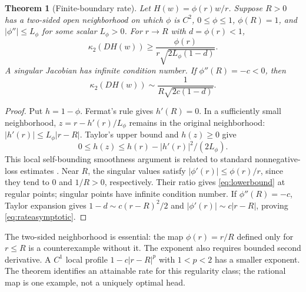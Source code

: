 \documentclass[10pt,a4paper]{article}
\newtheorem{theorem}{Theorem}
\begin{document}
\begin{theorem}[Finite-boundary rate]
\label{thm:rate}
Let $H(w)=\phi(r)w/r$. Suppose $R>0$ has a two-sided open neighborhood on which $\phi$ is $C^2$, $0\leq\phi\leq1$, $\phi(R)=1$, and $|\phi''|\leq L_\phi$ for some scalar $L_\phi>0$. For $r\to R$ with $d=\phi(r)<1$,
\begin{equation}
 \kappa_2(DH(w))\geq\frac{\phi(r)}{r\sqrt{2L_\phi(1-d)}}.
 \label{eq:lowerbound}
\end{equation}
A singular Jacobian has infinite condition number. If $\phi''(R)=-c<0$, then
\begin{equation}
 \kappa_2(DH(w))\sim\frac{1}{R\sqrt{2c(1-d)}}.
 \label{eq:rateasymptotic}
\end{equation}
\end{theorem}
\begin{proof}
Put $h=1-\phi$. Fermat's rule gives $h'(R)=0$. In a sufficiently small neighborhood, $z=r-h'(r)/L_\phi$ remains in the original neighborhood: $|h'(r)|\leq L_\phi|r-R|$. Taylor's upper bound and $h(z)\geq0$ give
\begin{equation*}
 0\leq h(z)\leq h(r)-|h'(r)|^2/(2L_\phi).
\end{equation*}
This local self-bounding smoothness argument is related to standard nonnegative-loss estimates \cite{supp-selfbound}. Near $R$, the singular values satisfy $|\phi'(r)|\le\phi(r)/r$, since they tend to $0$ and $1/R>0$, respectively. Their ratio gives \eqref{eq:lowerbound} at regular points; singular points have infinite condition number. If $\phi''(R)=-c$, Taylor expansion gives $1-d\sim c(r-R)^2/2$ and $|\phi'(r)|\sim c|r-R|$, proving \eqref{eq:rateasymptotic}.
\end{proof}
The two-sided neighborhood is essential: the map $\phi(r)=r/R$ defined only for $r\leq R$ is a counterexample without it. The exponent also requires bounded second derivative. A $C^1$ local profile $1-c|r-R|^p$ with $1<p<2$ has a smaller exponent. The theorem identifies an attainable rate for this regularity class; the rational map is one example, not a uniquely optimal head.
\end{document}
